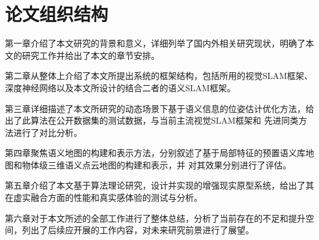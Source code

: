 \section{论文组织结构}
第一章介绍了本文研究的背景和意义，详细列举了国内外相关研究现状，明确了本文的研究工作并给出了本文的章节安排。

第二章从整体上介绍了本文所提出系统的框架结构，包括所用的视觉SLAM框架、深度神经网络以及本文所设计的结合二者的语义SLAM框架。

第三章详细描述了本文所研究的动态场景下基于语义信息的位姿估计优化方法，给出了此算法在公开数据集的测试数据，与当前主流视觉SLAM框架和
先进同类方法进行了对比分析。

第四章聚焦语义地图的构建和表示方法，分别叙述了基于局部特征的预置语义库地图和物体级三维语义点云地图的构建和表示，并
对其效果分别进行了评估。

第五章介绍了本文基于算法理论研究，设计并实现的增强现实原型系统，给出了其在虚实融合方面的性能和真实感体验的测试与分析。

第六章对于本文所述的全部工作进行了整体总结，分析了当前存在的不足和提升空间，列出了后续应开展的工作内容，对未来研究前景进行了展望。
